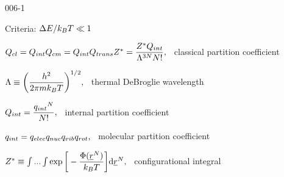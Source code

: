 \begin{mitframe}{006-1} %

    
	\begin{listone}
    
    	\item Criteria: ${\iipf\energy}/{\boltz\Temp} \ll 1$
    
    
    	\item $ \cpc = \ipc\cmpc = \ipc \heatflow_{trans} \configint = \dfrac{\configint\ipc}{\debroglie^{3N}\nummoles!},$ ~classical partition coefficient 
    
    
    	\begin{listtwo}
    
    		\item $\debroglie \equiv \bigg(\dfrac{\planck^2}{2\pie\mass\boltz\Temp}\bigg)^{{1}/{2}},$ ~thermal DeBroglie wavelength
        
  
    		\item $\ipc = \dfrac{{\impc}^{\nummoles}}{\nummoles!} ,$ ~internal partition coefficient
        
        		\begin{listthree}
    
    				\item $\impc = \empc\nmpc\vmpc\rmpc ,$ ~molecular partition coefficient
    
    			\end{listthree}
    
    		\item $\configint \equiv \int...\int\exp\bigg[-\dfrac{\pot(\uline{\pos}^{\nummoles})}{\boltz\Temp}\bigg]\mathrm{d}\uline{\pos}^{\nummoles} ,$ ~configurational integral
    
    
    
    
    	\end{listtwo}
    
	\end{listone}
    
\end{mitframe}